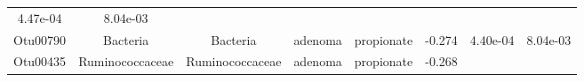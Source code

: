 \documentclass[11pt,]{article}
\begin{document}
\begin{longtable}[]{@{}cccccccc@{}}
\begin{minipage}[t]{0.08\columnwidth}
4.47e-04\strut
\end{minipage} & \begin{minipage}[t]{0.08\columnwidth}\centering\strut
8.04e-03\strut
\end{minipage}\tabularnewline
\begin{minipage}[t]{0.08\columnwidth}\centering\strut
Otu00790\strut
\end{minipage} & \begin{minipage}[t]{0.15\columnwidth}\centering\strut
Bacteria\strut
\end{minipage} & \begin{minipage}[t]{0.15\columnwidth}\centering\strut
Bacteria\strut
\end{minipage} & \begin{minipage}[t]{0.08\columnwidth}\centering\strut
adenoma\strut
\end{minipage} & \begin{minipage}[t]{0.09\columnwidth}\centering\strut
propionate\strut
\end{minipage} & \begin{minipage}[t]{0.07\columnwidth}\centering\strut
-0.274\strut
\end{minipage} & \begin{minipage}[t]{0.08\columnwidth}\centering\strut
4.40e-04\strut
\end{minipage} & \begin{minipage}[t]{0.08\columnwidth}\centering\strut
8.04e-03\strut
\end{minipage}\tabularnewline
\begin{minipage}[t]{0.08\columnwidth}\centering\strut
Otu00435\strut
\end{minipage} & \begin{minipage}[t]{0.15\columnwidth}\centering\strut
Ruminococcaceae\strut
\end{minipage} & \begin{minipage}[t]{0.15\columnwidth}\centering\strut
Ruminococcaceae\strut
\end{minipage} & \begin{minipage}[t]{0.08\columnwidth}\centering\strut
adenoma\strut
\end{minipage} & \begin{minipage}[t]{0.09\columnwidth}\centering\strut
propionate\strut
\end{minipage} & \begin{minipage}[t]{0.07\columnwidth}\centering\strut
-0.268\strut
\end{minipage} & \begin{minipage}[t]{0.08\columnwidth}\centering\strut

\end{minipage}
\end{longtable}
\end{document}
